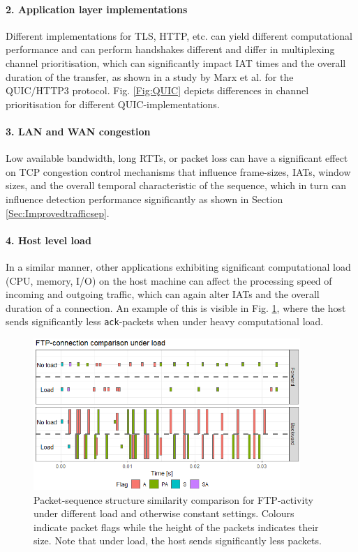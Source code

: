 \documentclass[runningheads]{llncs}
\begin{document}
\paragraph{2. Application layer implementations}
Different implementations for TLS, HTTP, etc. can yield different computational performance and can perform handshakes different and differ in multiplexing channel prioritisation, which can significantly impact IAT times and the overall duration of the transfer, as shown in a study by Marx et al. \cite{marx2020same} for the QUIC/HTTP3 protocol. Fig. \ref{Fig:QUIC} depicts differences in channel prioritisation for different QUIC-implementations.


\paragraph{3. LAN and WAN congestion}
Low available bandwidth, long RTTs, or packet loss can have a significant effect on TCP congestion control mechanisms that influence frame-sizes, IATs, window sizes, and the overall temporal characteristic of the sequence, which in turn can influence detection performance significantly as shown in Section \ref{Sec:Improvedtrafficsep}.


\paragraph{4. Host level load}
In a similar manner, other applications exhibiting significant computational load (CPU, memory, I/O) on the host machine can affect the processing speed of incoming and outgoing traffic, which can again alter IATs and the overall duration of a connection. An example of this is visible in Fig. \ref{Fig:FTP_load}, where the host sends significantly less \texttt{ack}-packets when under heavy computational load. 

\begin{figure}
\centering
\includegraphics[width=0.9\textwidth]{images/FTP_load.png}
\caption{Packet-sequence structure similarity comparison for FTP-activity under different load and otherwise constant settings. Colours indicate packet flags while the height of the packets indicates their size. Note that under load, the host sends significantly less packets.}\label{Fig:FTP_load}
\end{figure}
\end{document}
